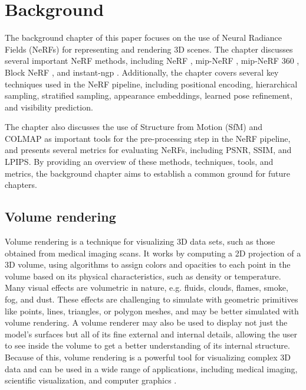 \chapter{Background} \label{chap:relatedwork}

The background chapter of this paper focuses on the use of Neural Radiance Fields (NeRFs) for representing and rendering 3D scenes. The chapter discusses several important NeRF methods, including NeRF \cite{mildenhall_nerf_2020}, mip-NeRF \cite{barron_mip-nerf_2021}, mip-NeRF 360 \cite{barron_mip-nerf_2022}, Block NeRF \cite{tancik_block-nerf_2022}, and instant-ngp \cite{muller_instant_2022}. Additionally, the chapter covers several key techniques used in the NeRF pipeline, including positional encoding, hierarchical sampling, stratified sampling, appearance embeddings, learned pose refinement, and visibility prediction.

The chapter also discusses the use of Structure from Motion (SfM) and COLMAP \cite{schoenberger2016sfm} as important tools for the pre-processing step in the NeRF pipeline, and presents several metrics for evaluating NeRFs, including PSNR, SSIM, and LPIPS. By providing an overview of these methods, techniques, tools, and metrics, the background chapter aims to establish a common ground for future chapters.

\section{Volume rendering} \label{sec:volumerendering}
Volume rendering is a technique for visualizing 3D data sets, such as those obtained from medical imaging scans. It works by computing a 2D projection of a 3D volume, using algorithms to assign colors and opacities to each point in the volume based on its physical characteristics, such as density or temperature. Many visual effects are volumetric in nature, e.g. fluids, clouds, flames, smoke, fog, and dust. These effects are challenging to simulate with geometric primitives like points, lines, triangles, or polygon meshes, and may be better simulated with volume rendering. A volume renderer may also be used to display not just the model's surfaces but all of its fine external and internal details, allowing the user to see inside the volume to get a better understanding of its internal structure. Because of this, volume rendering is a powerful tool for visualizing complex 3D data and can be used in a wide range of applications, including medical imaging, scientific visualization, and computer graphics \cite{max_optical_1995}.

